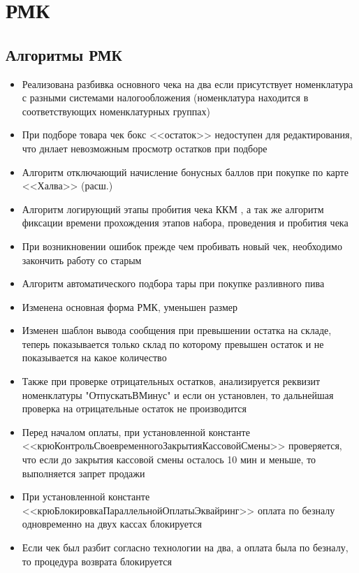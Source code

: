 \section{РМК}
\subsection{Алгоритмы РМК}


\begin{itemize}
	\item Реализована разбивка основного чека на два если присутствует номенклатура с разными системами налогообложения  (номенклатура находится в соответствующих номенклатурных группах)
	\item При подборе товара чек бокс <<остаток>> недоступен для редактирования, что днлает невозможным просмотр остатков при подборе
	\item  Алгоритм отключающий начисление бонусных баллов при покупке по карте <<Халва>> (расш.)
	\item Алгоритм логирующий этапы пробития чека ККМ , а так же алгоритм фиксации времени прохождения этапов набора, проведения и пробития чека
	\item При возникновении ошибок прежде чем пробивать новый чек, необходимо закончить работу со старым
	\item Алгоритм автоматического подбора тары при покупке разливного пива
	\item Изменена основная форма РМК, уменьшен размер
	\item Изменен шаблон вывода сообщения при превышении остатка на складе, теперь показывается только склад по которому превышен остаток и не показывается на какое количество
	\item Также при проверке отрицательных остатков, анализируется реквизит номенклатуры "ОтпускатьВМинус" и если он установлен, то дальнейшая проверка на отрицательные остаток не производится
	\item Перед началом оплаты, при установленной константе <<крюКонтрольСвоевременногоЗакрытияКассовойСмены>> проверяется, что если до закрытия кассовой смены осталось 10 мин и меньше, то выполняется запрет продажи
 	\item При установленной константе <<крюБлокировкаПараллельнойОплатыЭквайринг>> оплата по безналу одновременно на двух кассах блокируется
 	\item Если чек был разбит согласно технологии на два, а оплата была по безналу, то процедура возврата блокируется

\end{itemize}
